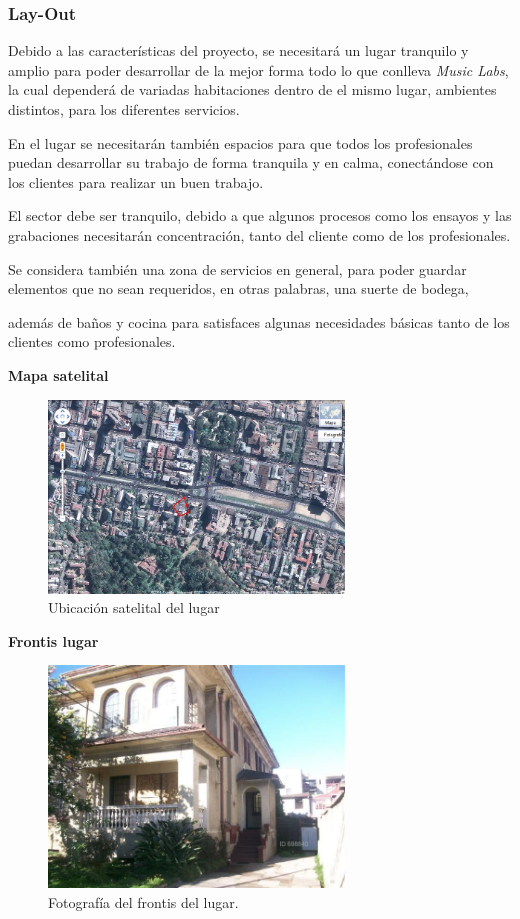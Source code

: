 \subsubsection{Lay-Out}

Debido a las características del proyecto, se necesitará un lugar tranquilo y amplio
para poder desarrollar de la mejor forma todo lo que conlleva \emph{Music Labs},
la cual dependerá de variadas habitaciones dentro de el mismo lugar,
ambientes distintos, para los diferentes servicios.

En el lugar se necesitarán también espacios para que todos los profesionales
puedan desarrollar su trabajo de forma tranquila y en calma, conectándose con
los clientes para realizar un buen trabajo.

El sector debe ser tranquilo, debido a que algunos procesos como los ensayos
y las grabaciones necesitarán concentración, tanto del cliente como de los profesionales.

Se considera también una zona de servicios en general, para poder guardar
elementos que no sean requeridos, en otras palabras, una suerte de bodega,

además de baños y cocina para satisfaces algunas necesidades básicas
tanto de los clientes como profesionales.

\newpage
{\bf Mapa satelital}

\begin{figure}[h!t]
   \centering
   \includegraphics[width=0.7\textwidth]{img/maps.png}
   \caption{Ubicación satelital del lugar}
   \label{fig:mapa}
\end{figure}

{\bf Frontis lugar}

\begin{figure}[h!t]
   \centering
   \includegraphics[width=0.7\textwidth]{img/foto_local_1.jpg}
   \caption{Fotografía del frontis del lugar.}
   \label{fig:frontis}
\end{figure}

